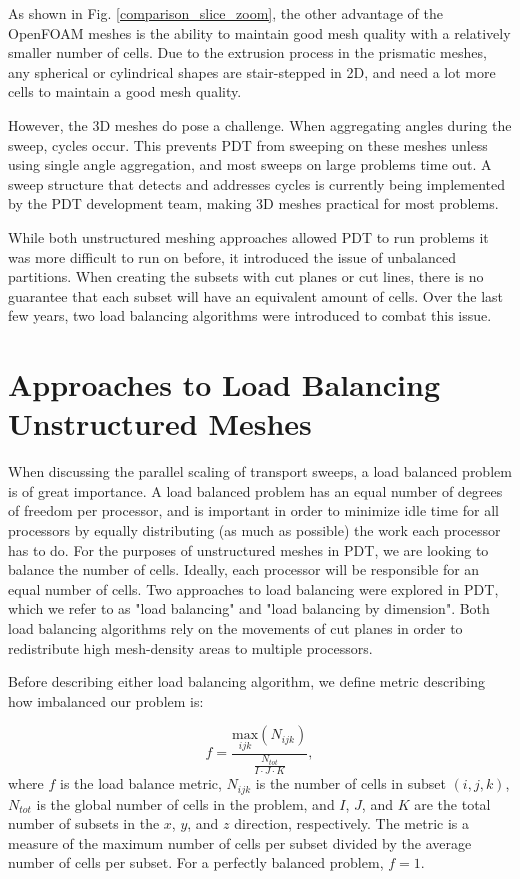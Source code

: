 \documentclass[11pt, letterpaper,titlepage,oneside]{article}
\begin{document}
As shown in Fig. \ref{comparison_slice_zoom}, the other advantage of the OpenFOAM meshes is the ability to maintain good mesh quality with a relatively smaller number of cells. Due to the extrusion process in the prismatic meshes, any spherical or cylindrical shapes are stair-stepped in 2D, and need a lot more cells to maintain a good mesh quality.

However, the 3D meshes do pose a challenge. When aggregating angles during the sweep, cycles occur. This prevents PDT from sweeping on these meshes unless using single angle aggregation, and most sweeps on large problems time out. A sweep structure that detects and addresses cycles is currently being implemented by the PDT development team, making 3D meshes practical for most problems.

While both unstructured meshing approaches allowed PDT to run problems it was more difficult to run on before, it introduced the issue of unbalanced partitions. When creating the subsets with cut planes or cut lines, there is no guarantee that each subset will have an equivalent amount of cells. Over the last few years, two load balancing algorithms were introduced to combat this issue.

\section{Approaches to Load Balancing Unstructured Meshes}

When discussing the parallel scaling of transport sweeps, a load balanced problem is of great importance. A load balanced problem has an equal number of degrees of freedom per processor, and is important in order to minimize idle time for all processors by equally distributing (as much as possible) the work each processor has to do.  For the purposes of unstructured meshes in PDT, we are looking to balance the number of cells. Ideally, each processor will be responsible for an equal number of cells. Two approaches to load balancing were explored in PDT, which we refer to as "load balancing" and "load balancing by dimension". 
Both load balancing algorithms rely on the movements of cut planes in order to redistribute high mesh-density areas to multiple processors.

Before describing either load balancing algorithm, we define metric describing how imbalanced our problem is:

\begin{equation}
f =\frac{\underset{ijk}{\text{max}}(N_{ijk})}{\frac{N_{tot}}{I\cdot J\cdot K}},
\label{metric_def}
\end{equation}
where $f$ is the load balance metric, $N_{ijk}$ is the number of cells in subset $(i,j,k)$, $N_{tot}$ is the global number of cells in the problem, and $I$, $J$, and $K$ are the total number of subsets in the $x$, $y$, and $z$ direction, respectively. The metric is a measure of the maximum number of cells per subset divided by the average number of cells per subset. For a perfectly balanced problem, $f = 1$.
\end{document}
